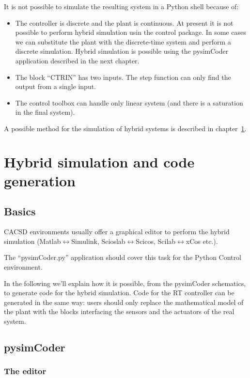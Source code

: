 It is not possible to simulate the resulting system in a Python shell because of:

\begin{itemize}
\item The controller is discrete and the plant is continuous. At present it is 
not possible to perform hybrid simulation usin the control package. In some 
cases we can substitute the plant with the discrete-time system and perform a 
discrete 
simulation. Hybrid simulation is possible using the pysimCoder application 
described in the next chapter.
\item The block ``CTRIN'' has two inputs. The step function can only find the 
output from a single input.
\item The control toolbox can handle only linear system (and there is a 
saturation in the final system).
\end{itemize}

A possible method for the simulation of hybrid systems is described in chapter~\ref{ch:hybsim}.

\chapter{Hybrid simulation and code generation}
\label{ch:hybsim}

\section{Basics}

CACSD environments usually offer a graphical 
editor to perform the hybrid simulation (Matlab$\leftrightarrow$Simulink, 
Scioslab$\leftrightarrow$Scicos, Scilab$\leftrightarrow$xCos etc.).

The ``pysimCoder.py'' application should cover this task for the Python Control 
environment.

In the following we'll explain how it is possible, from the pysimCoder schematics, 
to generate code for the hybrid simulation. Code for the RT controller can be 
generated in the same way: users should only replace the mathematical model 
of the plant with the blocks interfacing the sensors and the actuators of the 
real system.

\section{pysimCoder}

\subsection{The editor}

